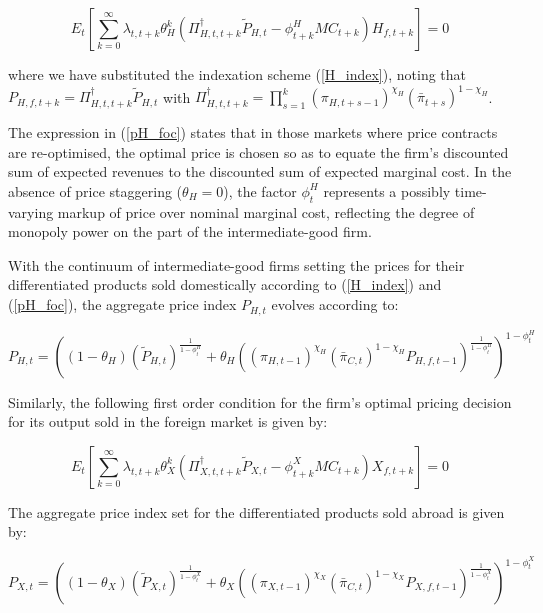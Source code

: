 \documentclass[a4paper,11pt]{article}
\numberwithin{equation}{section}
\begin{document}
	\begin{equation} \label{pH_foc}
	E_t\left[\sum_{k=0}^{\infty}\lambda_{t,t+k}\theta^k_H\left(\Pi^{\dagger}_{H,t,t+k}\tilde{P}_{H,t}-\phi^H_{t+k}MC_{t+k}\right)H_{f,t+k}\right]=0
	\end{equation}
	
	where we have substituted the indexation scheme (\ref{H_index}), noting that $P_{H,f,t+k}=\Pi^{\dagger}_{H,t,t+k}\tilde{P}_{H,t}$ with $\Pi^{\dagger}_{H,t,t+k}=\prod_{s=1}^{k}\left(\pi_{H,t+s-1}\right)^{\chi_H}\left(\bar{\pi}_{t+s}\right)^{1-\chi_H}$.
	
	The expression in (\ref{pH_foc}) states that in those markets where price contracts are re-optimised, the optimal price is chosen so as to equate the firm's discounted sum of expected revenues to the discounted sum of expected marginal cost. In the absence of price staggering ($\theta_H = 0$), the factor $\phi^H_t$ represents a possibly time-varying markup of price over nominal marginal cost, reflecting the degree of monopoly power on the part of the intermediate-good firm.
	
	With the continuum of intermediate-good firms setting the prices for their differentiated products sold domestically according to (\ref{H_index}) and (\ref{pH_foc}), the aggregate price index $P_{H,t}$ evolves according to:
	
	\begin{equation}
	P_{H,t}=\left(\left(1-\theta_H\right)\left(\tilde{P}_{H,t}\right)^{\frac{1}{1-\phi_t^H}}+\theta_H\left(\left(\pi_{H,t-1}\right)^{\chi_H}\left(\bar{\pi}_{C,t}\right)^{1-\chi_H}P_{H,f,t-1}\right)^{\frac{1}{1-\phi_t^H}}\right)^{1-\phi_t^H}
	\end{equation}
	
	Similarly, the following first order condition for the firm's optimal pricing decision for its output sold in the foreign market is given by:
	
	\begin{equation} \label{pX_foc}
	E_t\left[\sum_{k=0}^{\infty}\lambda_{t,t+k}\theta^k_X\left(\Pi^{\dagger}_{X,t,t+k}\tilde{P}_{X,t}-\phi^X_{t+k}MC_{t+k}\right)X_{f,t+k}\right]=0
	\end{equation}
	
	The aggregate price index set for the differentiated products sold abroad is given by:
	
	\begin{equation}
	P_{X,t}=\left(\left(1-\theta_X\right)\left(\tilde{P}_{X,t}\right)^{\frac{1}{1-\phi_t^X}}+\theta_X\left(\left(\pi_{X,t-1}\right)^{\chi_X}\left(\bar{\pi}_{C,t}\right)^{1-\chi_X}P_{X,f,t-1}\right)^{\frac{1}{1-\phi_t^X}}\right)^{1-\phi_t^X}
	\end{equation}
	
\end{document}

